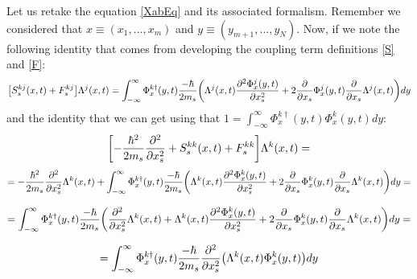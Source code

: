 \documentclass[11pt, a4paper]{article} %
\begin{document}
Let us retake the equation \eqref{XabEq} and its associated formalism. Remember we considered that $x\equiv (x_1,...,x_m)$ and $y\equiv (y_{m+1},...,y_N)$. Now, if we note the following identity that comes from developing the coupling term definitions \eqref{S} and \eqref{F}:
\begin{equation}
\qty[S^{kj}_s(x,t)+F_s^{kj}]\Lambda^j(x,t)=\int_{-\infty}^\infty \Phi^{k\dagger}_x(y,t) \frac{-\hbar}{2m_s}\qty( \Lambda^j(x,t)\pdv[2]{\Phi^j_x(y,t)}{x_s}+2\pdv{}{x_s}\Phi^j_x(y,t)\pdv{}{x_s}\Lambda^j(x,t) ) dy
\end{equation}
and the identity that we can get using that $1=\int_{-\infty}^\infty \Phi^{k\dagger}_x(y,t) \Phi^k_x(y,t)dy$:
\begin{equation}
\qty[-\frac{\hbar^2}{2m_s}\pdv[2]{}{x_s}+S^{kk}_s(x,t)+F_s^{kk}]\Lambda^k(x,t)=
\end{equation}
$$
=-\frac{\hbar^2}{2m_s}\pdv[2]{}{x_s}\Lambda^k(x,t)+\int_{-\infty}^\infty \Phi^{k\dagger}_x(y,t) \frac{-\hbar}{2m_s}\qty( \Lambda^k(x,t)\pdv[2]{\Phi^k_x(y,t)}{x_s}+2\pdv{}{x_s}\Phi^k_x(y,t)\pdv{}{x_s}\Lambda^k(x,t) ) dy=
$$

$$
=\int_{-\infty}^\infty \Phi^{k\dagger}_x(y,t) \frac{-\hbar}{2m_s}\qty(\pdv[2]{}{x_s}\Lambda^k(x,t)+ \Lambda^k(x,t)\pdv[2]{\Phi^k_x(y,t)}{x_s}+2\pdv{}{x_s}\Phi^k_x(y,t)\pdv{}{x_s}\Lambda^k(x,t) ) dy=
$$

$$
=\int_{-\infty}^\infty \Phi^{k\dagger}_x(y,t) \frac{-\hbar}{2m_s} \pdv[2]{}{x_s}\qty(\Lambda^k(x,t)\Phi^k_x(y,t))dy
$$
\end{document}
